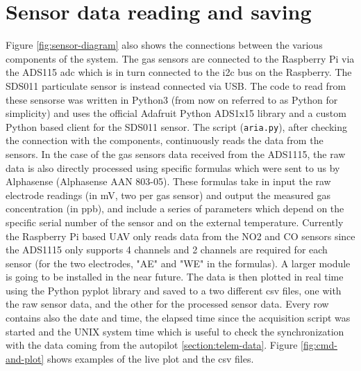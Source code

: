 \section{Sensor data reading and saving}
Figure \ref{fig:sensor-diagram} also shows the connections between the various components of the system. The gas sensors are connected to the Raspberry Pi via the ADS115 \gls{adc} which is in turn connected to the i2c bus on the Raspberry. The SDS011 particulate sensor is instead connected via USB.
The code to read from these sensorse was written in Python3 (from now on referred to as Python for simplicity) and uses the official Adafruit Python ADS1x15 library and a custom Python based client for the SDS011 sensor.
The script (\texttt{aria.py}), after checking the connection with the components, continuously reads the data from the sensors. In the case of the gas sensors data received from the ADS1115, the raw data is also directly processed using specific formulas which were sent to us by Alphasense (Alphasense AAN 803-05). These formulas take in input the raw electrode readings (in mV, two per gas sensor) and output the measured gas concentration (in ppb), and include a series of parameters which depend on the specific serial number of the sensor and on the external temperature. Currently the Raspberry Pi based UAV only reads data from the NO2 and CO sensors since the ADS1115 only supports 4 channels and 2 channels are required for each sensor (for the two electrodes, "AE" and "WE" in the formulas). A larger module is going to be installed in the near future.
The data is then plotted in real time using the Python pyplot library and saved to a two different csv files, one with the raw sensor data, and the other for the processed sensor data. Every row contains also the date and time, the elapsed time since the acquisition script was started and the UNIX system time which is useful to check the synchronization with the data coming from the autopilot \ref{section:telem-data}. Figure \ref{fig:cmd-and-plot} shows examples of the live plot and the csv files.
